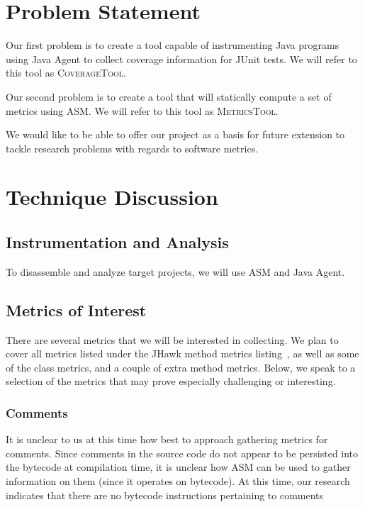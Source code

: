 \newcommand{\ct}{\mbox{\textsc{CoverageTool}}}
\newcommand{\mt}{\mbox{\textsc{MetricsTool}}}

\section{Problem Statement}

Our first problem is to create a tool capable of instrumenting Java programs using Java Agent to collect coverage information for JUnit tests. We will refer to this tool as \ct{}.

Our second problem is to create a tool that will statically compute a set of metrics using ASM. We will refer to this tool as \mt{}.

We would like to be able to offer our project as a basis for future extension to tackle research problems with regards to software metrics.

\section{Technique Discussion}

\subsection{Instrumentation and Analysis}

To disassemble and analyze target projects, we will use ASM and Java Agent.

\subsection{Metrics of Interest}

There are several metrics that we will be interested in  collecting. We plan to cover all metrics listed under the JHawk method metrics listing~\cite{jhawkmetrics}, as well as some of the class metrics, and a couple of extra method metrics. Below, we speak to a selection of the metrics that may prove especially challenging or interesting.

\subsubsection{Comments}

It is unclear to us at this time how best to approach gathering metrics for comments. Since comments in the source code do not appear to be persisted into the bytecode at compilation time, it is unclear how ASM can be used to gather information on them (since it operates on bytecode). At this time, our research indicates that there are no bytecode instructions pertaining to comments 

